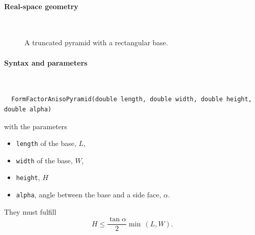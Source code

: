 
 \label{SAnisoPyramid}

\paragraph{Real-space geometry}\strut\\

\begin{figure}[H]
\hfill
{}
\hfill
{}
\hfill
{}
\hfill
\caption{A truncated pyramid with a rectangular base.}
\end{figure}

\FloatBarrier

\paragraph{Syntax and parameters}\strut\\[-2ex plus .2ex minus .2ex]
\begin{lstlisting}
  FormFactorAnisoPyramid(double length, double width, double height, double alpha)
\end{lstlisting}
with the parameters
\begin{itemize}
\item \texttt{length} of the base, $L$,
\item \texttt{width} of the base, $W$,
\item \texttt{height}, $H$
\item \texttt{alpha}, angle between the base and a side face, $\alpha$.
\end{itemize}
They must fulfill
\begin{displaymath}
  H \le \frac{\tan\alpha}{2} \min\,(L,W).
\end{displaymath}

